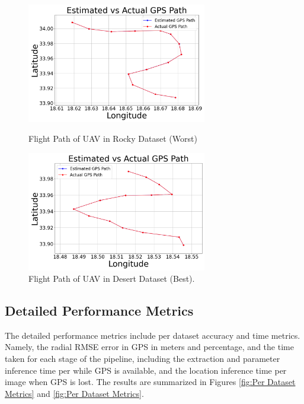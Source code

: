     \begin{figure}[H]
        \centering
        \begin{minipage}{0.45\textwidth}
            \centering
            \includegraphics[width=0.7\textwidth]{./Chapter 5/GPSpaths/PathCity1.png}
            \caption{Flight Path of UAV in Rocky Dataset (Worst)}
            \label{fig:Flight Path ROCKY}
        \end{minipage}\hfill
        \begin{minipage}{0.45\textwidth}
            \centering
            \includegraphics[width=0.7\textwidth]{./Chapter 5/GPSpaths/PathCity2.png}
            \caption{Flight Path of UAV in Desert Dataset (Best).}
            \label{fig:Flight Path DESERT}
        \end{minipage}
    \end{figure}


\subsection{Detailed Performance Metrics}
The detailed performance metrics include per dataset accuracy and time metrics. Namely, the radial RMSE error in GPS in meters and percentage, and the time taken for each stage of the pipeline, including the extraction and parameter inference time per while GPS is available, and the location inference time per image when GPS is lost. The results are summarized in Figures \ref{fig:Per Dataset Metrics} and \ref{fig:Per Dataset Metrics}. 

